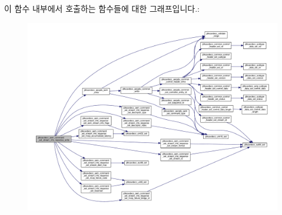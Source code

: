 이 함수 내부에서 호출하는 함수들에 대한 그래프입니다.\+:
\nopagebreak
\begin{figure}[H]
\begin{center}
\leavevmode
\includegraphics[width=350pt]{group__command__set__stream__info__response_gae6042bf21ef027d418f6a7ab1d278c69_cgraph}
\end{center}
\end{figure}


